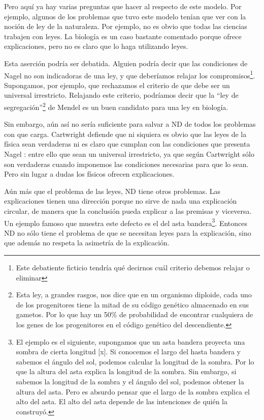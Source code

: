 Pero aquí ya hay varias preguntas que hacer al respecto de este modelo. Por ejemplo, algunos de los problemas que tuvo este modelo tenían que ver con la noción de ley de la naturaleza. Por ejemplo, no es obvio que todas las ciencias trabajen con leyes. La biología es un caso bastante comentado porque ofrece explicaciones, pero no es claro que lo haga utilizando leyes.

Esta aserción podría ser debatida. Alguien podría decir que las condiciones de Nagel no son indicadoras de una ley, y que deberíamos relajar los compromisos\footnote{Este debatiente ficticio tendría qué decirnos cuál criterio debemos relajar o eliminar}. Supongamos, por ejemplo, que rechazamos el criterio de que debe ser un universal irrestricto. Relajando este criterio, podríamos decir que la ``ley de segregación''\footnote{Esta ley, a grandes rasgos, nos dice que en un organismo diploide, cada uno de los progenitores tiene la mitad de su código genético almacenado en sus gametos. Por lo que hay un 50\% de probabilidad de encontrar cualquiera de los genes de los progenitores en el código genético del descendiente.} de Mendel es un buen candidato para una ley en biología.

Sin embargo, aún así no sería suficiente para salvar a ND de todos los problemas con que carga. Cartwright defiende que ni siquiera es obvio que las leyes de la física sean verdaderas ni es claro que cumplan con las condiciones que presenta Nagel \cite{Cartwright1983}: entre ello que sean un universal irrestricto, ya que según Cartwright sólo son verdaderas cuando imponemos las condiciones necesarias para que lo sean. Pero sin lugar a dudas los físicos ofrecen explicaciones.

Aún más que el problema de las leyes, ND tiene otros problemas. Las explicaciones tienen una dirección porque no sirve de nada una explicación circular, de manera que la conclusión pueda explicar a las premisas y viceversa. Un ejemplo famoso que muestra este defecto es el del asta bandera\footnote{El ejemplo es el siguiente, supongamos que un asta bandera proyecta una sombra de cierta longitud [x]. Si conocemos el largo del hasta bandera y sabemos el ángulo del sol, podemos calcular la longitud de la sombra. Por lo que la altura del asta explica la longitud de la sombra. Sin embargo, si sabemos la longitud de la sombra y el ángulo del sol, podemos obtener la altura del asta. Pero es absurdo pensar que el largo de la sombra explica el alto del asta. El alto del asta depende de las intenciones de quién la construyó.}. Entonces ND no sólo tiene el problema de que se necesitan leyes para la explicación, sino que además no respeta la asimetría de la explicación.

